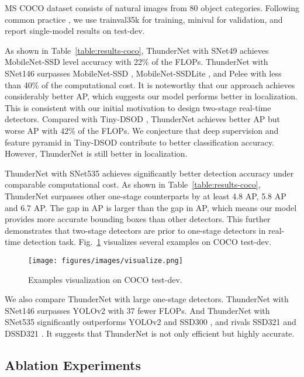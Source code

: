MS COCO dataset consists of natural images from 80 object categories.
Following common practice \cite{lin2017feature,li2017light}, we use trainval35k for training, minival for validation, and report single-model results on test-dev.

As shown in Table~\ref{table:results-coco}, ThunderNet with SNet49 achieves MobileNet-SSD level accuracy with 22\% of the FLOPs.
ThunderNet with SNet146 surpasses MobileNet-SSD \cite{howard2017mobilenets}, MobileNet-SSDLite \cite{sandler2018mobilenetv2}, and Pelee \cite{wang2018pelee} with less than 40\% of the computational cost.
It is noteworthy that our approach achieves considerably better AP, which suggests our model performs better in localization.
This is consistent with our initial motivation to design two-stage real-time detectors.
Compared with Tiny-DSOD \cite{li2018tiny}, ThunderNet achieves better AP but worse AP with 42\% of the FLOPs.
We conjecture that deep supervision and feature pyramid in Tiny-DSOD contribute to better classification accuracy.
However, ThunderNet is still better in localization.

ThunderNet with SNet535 achieves significantly better detection accuracy under comparable computational cost.
As shown in Table~\ref{table:results-coco}, ThunderNet surpasses other one-stage counterparts by at least 4.8 AP, 5.8 AP and 6.7 AP.
The gap in AP is larger than the gap in AP, which means our model provides more accurate bounding boxes than other detectors.
This further demonstrates that two-stage detectors are prior to one-stage detectors in real-time detection task.
Fig.~\ref{figure:coco-visualization} visualizes several examples on COCO test-dev.



\begin{figure}[!t]
\centering
\texttt{[image: figures/images/visualize.png]}
\caption{Examples visualization on COCO test-dev.}
\label{figure:coco-visualization}
\end{figure} 
We also compare ThunderNet with large one-stage detectors.
ThunderNet with SNet146 surpasses YOLOv2 \cite{redmon2017yolo9000} with 37 fewer FLOPs.
And ThunderNet with SNet535 significantly outperforms YOLOv2 and SSD300 \cite{liu2016ssd}, and rivals SSD321 \cite{fu2017dssd} and DSSD321 \cite{fu2017dssd}.
It suggests that ThunderNet is not only efficient but highly accurate.

\subsection{Ablation Experiments}

